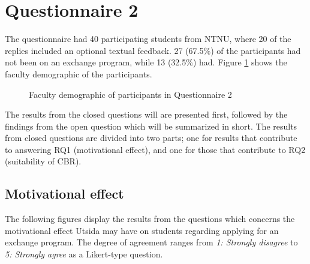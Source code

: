 \section{Questionnaire 2}
The questionnaire had 40 participating students from NTNU, where 20 of the replies included an optional textual feedback. 27 (67.5\%) of the participants had not been on an exchange program, while 13 (32.5\%) had. Figure \ref{fig:faculty_demographic} shows the faculty demographic of the participants.

\begin{figure}[h]
    \small
    \centering
    \caption{Faculty demographic of participants in Questionnaire 2}
    \label{fig:faculty_demographic}
\end{figure}

The results from the closed questions will are presented first, followed by the findings from the open question which will be summarized in short. The results from closed questions are divided into two parts; one for results that contribute to answering RQ1 (motivational effect), and one for those that contribute to RQ2 (suitability of CBR).

\subsection{Motivational effect}

The following figures display the results from the questions which concerns the motivational effect Utsida may have on students regarding applying for an exchange program. The degree of agreement ranges from \textit{1: Strongly disagree} to \textit{5: Strongly agree} as a Likert-type question.



